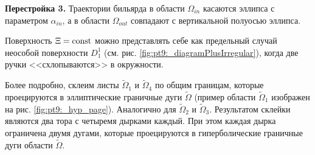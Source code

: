 %

\textbf{Перестройка 3.}
Траектории бильярда в области $\Omega_{in}$ касаются эллипса с параметром $\alpha_{in}$, а в области $\Omega_{out}$ совпадают с вертикальной полуосью эллипса.

Поверхность $\Xi = \mathrm{const}$  можно представлять себе как предельный случай неособой поверхности $D_1^1$ (см. рис. \ref{fig:pt9:_diagramPlusIrregular}), когда две ручки <<схлопываются>> в окружности.

Более подробно, склеим листы $\widetilde{\Omega}_1$ и $\widetilde{\Omega}_4$ по общим границам, которые проецируются в эллиптические граничные дуги $\widetilde{\Omega}$ (пример области $\widetilde{\Omega}_1$ изображен на рис. \ref{fig:pt9:_hyp_page}). Аналогично для 
$\widetilde{\Omega}_2$ и $\widetilde{\Omega}_3$. Результатом склейки являются два тора с четыремя дырками каждый. При этом каждая дырка ограничена двумя дугами, которые проецируются в гиперболические граничные дуги области $\widetilde{\Omega}$. 

